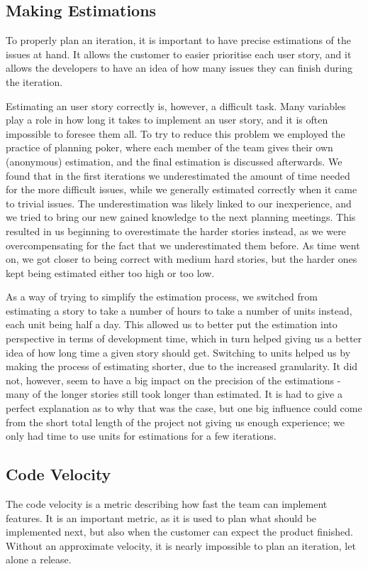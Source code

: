 \subsection{Making Estimations}
To properly plan an iteration, it is important to have precise estimations of the issues at hand.
It allows the customer to easier prioritise each user story, and it allows the developers to have an idea of how many issues they can finish during the iteration.

Estimating an user story correctly is, however, a difficult task.
Many variables play a role in how long it takes to implement an user story, and it is often impossible to foresee them all.
To try to reduce this problem we employed the practice of planning poker, where each member of the team gives their own (anonymous) estimation, and the final estimation is discussed afterwards.
We found that in the first iterations we underestimated the amount of time needed for the more difficult issues, while we generally estimated correctly when it came to trivial issues.
The underestimation was likely linked to our inexperience, and we tried to bring our new gained knowledge to the next planning meetings.
This resulted in us beginning to overestimate the harder stories instead, as we were overcompensating for the fact that we underestimated them before.
As time went on, we got closer to being correct with medium hard stories, but the harder ones kept being estimated either too high or too low.

As a way of trying to simplify the estimation process, we switched from estimating a story to take a number of hours to take a number of units instead, each unit being half a day.
This allowed us to better put the estimation into perspective in terms of development time, which in turn helped giving us a better idea of how long time a given story should get.
Switching to units helped us by making the process of estimating shorter, due to the increased granularity.
It did not, however, seem to have a big impact on the precision of the estimations - many of the longer stories still took longer than estimated.
It is had to give a perfect explanation as to why that was the case, but one big influence could come from the short total length of the project not giving us enough experience; we only had time to use units for estimations for a few iterations.

\subsection{Code Velocity}
The code velocity is a metric describing how fast the team can implement features.
It is an important metric, as it is used to plan what should be implemented next, but also when the customer can expect the product finished.
Without an approximate velocity, it is nearly impossible to plan an iteration, let alone a release.

